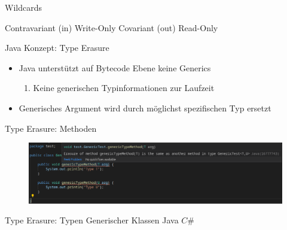 \documentclass[11pt]{beamer}
\begin{document}
\begin{frame}{Wildcards}

		Contravariant (\glqq in\grqq{}) Write-Only
	Covariant (\glqq out\grqq{}) Read-Only

\end{frame}


\begin{frame}{Java Konzept: Type Erasure}
	\begin{itemize}
	\item Java unterstützt auf Bytecode Ebene keine Generics
	\begin{enumerate}
		\item Keine generischen Typinformationen zur Laufzeit
	\end{enumerate}
	\item Generisches Argument wird durch möglichst spezifischen Typ ersetzt
	\end{itemize}
\end{frame}





\begin{frame}{Type Erasure: Methoden}
	\begin{figure}
		\includegraphics[width=\textwidth]{bilder/java_type_erasure.png}
	\end{figure}
\end{frame}

\begin{frame}{Type Erasure: Typen Generischer Klassen}
	Java
	$C\#$
\end{frame}
\end{document}

